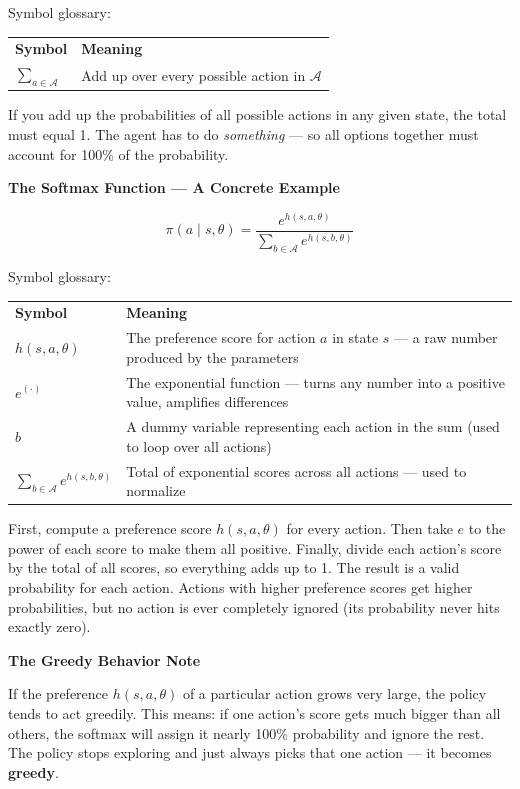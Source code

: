 Symbol glossary:

\begin{tabular}{ll}
\textbf{Symbol} & \textbf{Meaning} \\[4pt]
$\sum_{a \in \mathcal{A}}$ & Add up over every possible action in $\mathcal{A}$ \\
\end{tabular}

\medskip

If you add up the probabilities of all possible actions in any given state, the total must equal 1. The agent has to do \textit{something} --- so all options together must account for 100\% of the probability.

\textbf{The Softmax Function --- A Concrete Example}

\[
\pi(a \mid s, \theta) = \frac{e^{h(s,a,\theta)}}{\displaystyle\sum_{b \in \mathcal{A}} e^{h(s,b,\theta)}}
\]

Symbol glossary:

\begin{tabular}{ll}
\textbf{Symbol} & \textbf{Meaning} \\[4pt]
$h(s, a, \theta)$ & The preference score for action $a$ in state $s$ --- a raw number produced by the parameters \\
$e^{(\cdot)}$ & The exponential function --- turns any number into a positive value, amplifies differences \\
$b$ & A dummy variable representing each action in the sum (used to loop over all actions) \\
$\displaystyle\sum_{b \in \mathcal{A}} e^{h(s,b,\theta)}$ & Total of exponential scores across all actions --- used to normalize \\
\end{tabular}

\medskip

First, compute a preference score $h(s, a, \theta)$ for every action. Then take $e$ to the power of each score to make them all positive. Finally, divide each action's score by the total of all scores, so everything adds up to 1. The result is a valid probability for each action. Actions with higher preference scores get higher probabilities, but no action is ever completely ignored (its probability never hits exactly zero).

\textbf{The Greedy Behavior Note}

If the preference $h(s, a, \theta)$ of a particular action grows very large, the policy tends to act greedily. This means: if one action's score gets much bigger than all others, the softmax will assign it nearly 100\% probability and ignore the rest. The policy stops exploring and just always picks that one action --- it becomes \textbf{greedy}.



